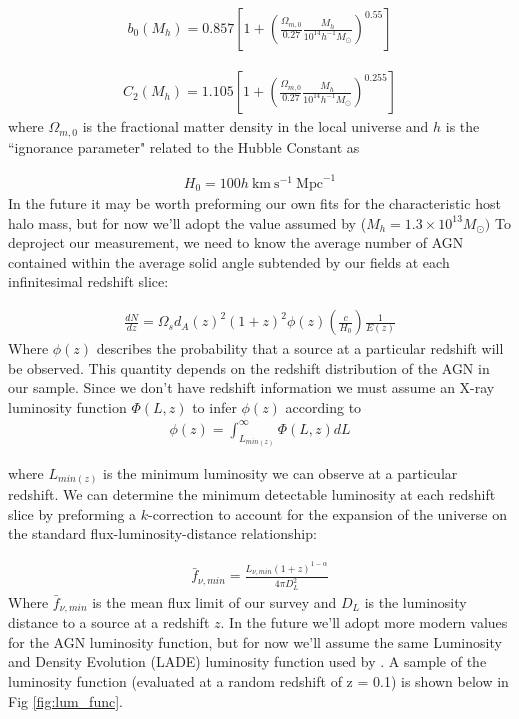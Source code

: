 \documentclass[preprint]{aastex63}
\begin{document}
    \begin{align}
        b_0(M_h) = 0.857\left[1+ \left(\frac{\Omega_{m,0}}{0.27} \frac{M_h}{10^{14}h^{-1}M_{\odot}}\right)^{0.55}\right]
    \end{align}
    
    \begin{align}
        C_2(M_h) = 1.105\left[1+ \left(\frac{\Omega_{m,0}}{0.27} \frac{M_h}{10^{14}h^{-1}M_{\odot}}\right)^{0.255}\right]
    \end{align}
    where $\Omega_{m,0}$ is the fractional matter density in the local universe and $h$ is the ``ignorance parameter" \cite{hogg} related to the Hubble Constant as 
    
    \begin{align}
        H_0 = 100h \ \text{km} \ \text{s}^{-1} \  \text{Mpc}^{-1}
    \end{align}
    In the future it may be worth preforming our own fits for the characteristic host halo mass, but for now we'll adopt the value assumed by \citet{koutoulidis} ($M_h = 1.3 \times 10^{13} M_{\odot})$
    To deproject our measurement, we need to know the average number of AGN contained within the average solid angle subtended 
    by our fields at each infinitesimal redshift slice:
    
    \begin{align}
        \label{eq:dndz}
        \frac{dN}{dz} = \Omega_s d_A(z)^2 (1+z)^2 \phi(z) \left(\frac{c}{H_0}\right)\frac{1}{E(z)}
    \end{align}
    Where $\phi(z)$ describes the probability that a source at a particular redshift will be observed. This quantity depends 
    on the redshift distribution of the AGN in our sample. Since we don't have redshift information we must assume an X-ray luminosity function 
     $\Phi(L,z)$ to infer $\phi(z)$ according to
     \begin{align}
         \label{eq:phi}
         \phi(z) = \int_{L_{min(z)}}^{\infty} \Phi(L,z) dL 
     \end{align}
    
     where $L_{min(z)}$ is the minimum luminosity we can observe at a particular redshift. We can determine the minimum detectable luminosity at each redshift slice
    by preforming a $k$-correction to account for the expansion of the universe on the standard flux-luminosity-distance relationship:

    \begin{align}
        \label{eq:flux_lim}
        \bar f_{\nu,min} = \frac{L_{\nu,min}(1+z)^{1-\alpha}}{4\pi D_L^2}
    \end{align}
    Where $ \bar f_{\nu,min}$ is the mean flux limit of our survey and $D_L$ is the luminosity distance to 
    a source at a redshift $z$.
     In the future we'll adopt more modern values for the AGN luminosity function, but for now we'll assume the same Luminosity and Density Evolution  (LADE) luminosity function used by \citet{koutoulidis} \citep{aird:2010}. 
    A sample of the luminosity function (evaluated at a random redshift of z = 0.1) is shown below in Fig \ref{fig:lum_func}.
    
\end{document}
